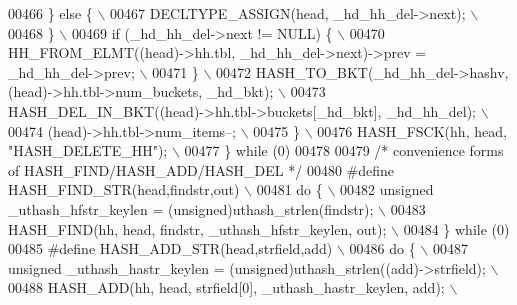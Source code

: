 \begin{DoxyCode}
{{{00466 \textcolor{preprocessor}{    \} else \{                                                                     \(\backslash\)}
00467 \textcolor{preprocessor}{      DECLTYPE\_ASSIGN(head, \_hd\_hh\_del->next);                                   \(\backslash\)}
00468 \textcolor{preprocessor}{    \}                                                                            \(\backslash\)}
00469 \textcolor{preprocessor}{    if (\_hd\_hh\_del->next != NULL) \{                                              \(\backslash\)}
00470 \textcolor{preprocessor}{      HH\_FROM\_ELMT((head)->hh.tbl, \_hd\_hh\_del->next)->prev = \_hd\_hh\_del->prev;   \(\backslash\)}
00471 \textcolor{preprocessor}{    \}                                                                            \(\backslash\)}
00472 \textcolor{preprocessor}{    HASH\_TO\_BKT(\_hd\_hh\_del->hashv, (head)->hh.tbl->num\_buckets, \_hd\_bkt);        \(\backslash\)}
00473 \textcolor{preprocessor}{    HASH\_DEL\_IN\_BKT((head)->hh.tbl->buckets[\_hd\_bkt], \_hd\_hh\_del);               \(\backslash\)}
00474 \textcolor{preprocessor}{    (head)->hh.tbl->num\_items--;                                                 \(\backslash\)}
00475 \textcolor{preprocessor}{  \}                                                                              \(\backslash\)}
00476 \textcolor{preprocessor}{  HASH\_FSCK(hh, head, "HASH\_DELETE\_HH");                                         \(\backslash\)}
00477 \textcolor{preprocessor}{\} while (0)}
00478 
00479 \textcolor{comment}{/* convenience forms of HASH\_FIND/HASH\_ADD/HASH\_DEL */}
00480 \textcolor{preprocessor}{#define HASH\_FIND\_STR(head,findstr,out)                                          \(\backslash\)}
00481 \textcolor{preprocessor}{do \{                                                                             \(\backslash\)}
00482 \textcolor{preprocessor}{    unsigned \_uthash\_hfstr\_keylen = (unsigned)uthash\_strlen(findstr);            \(\backslash\)}
00483 \textcolor{preprocessor}{    HASH\_FIND(hh, head, findstr, \_uthash\_hfstr\_keylen, out);                     \(\backslash\)}
00484 \textcolor{preprocessor}{\} while (0)}
00485 \textcolor{preprocessor}{#define HASH\_ADD\_STR(head,strfield,add)                                          \(\backslash\)}
00486 \textcolor{preprocessor}{do \{                                                                             \(\backslash\)}
00487 \textcolor{preprocessor}{    unsigned \_uthash\_hastr\_keylen = (unsigned)uthash\_strlen((add)->strfield);    \(\backslash\)}
00488 \textcolor{preprocessor}{    HASH\_ADD(hh, head, strfield[0], \_uthash\_hastr\_keylen, add);                  \(\backslash\)}
}}}
\end{DoxyCode}
